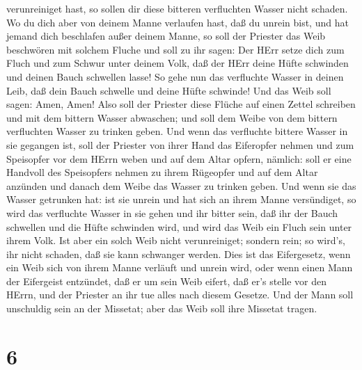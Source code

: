 verunreiniget hast, so sollen dir diese bitteren verfluchten Wasser
nicht schaden.  Wo du dich aber von deinem Manne verlaufen
hast, daß du unrein bist, und hat jemand dich beschlafen außer deinem
Manne,  so soll der Priester das Weib beschwören mit
solchem Fluche und soll zu ihr sagen: Der HErr setze dich zum Fluch und
zum Schwur unter deinem Volk, daß der HErr deine Hüfte schwinden und
deinen Bauch schwellen lasse!  So gehe nun das verfluchte
Wasser in deinen Leib, daß dein Bauch schwelle und deine Hüfte schwinde!
Und das Weib soll sagen: Amen, Amen!  Also soll der
Priester diese Flüche auf einen Zettel schreiben und mit dem bittern
Wasser abwaschen;  und soll dem Weibe von dem bittern
verfluchten Wasser zu trinken geben. Und wenn das verfluchte bittere
Wasser in sie gegangen ist,  soll der Priester von ihrer
Hand das Eiferopfer nehmen und zum Speisopfer vor dem HErrn weben und
auf dem Altar opfern, nämlich:  soll er eine Handvoll des
Speisopfers nehmen zu ihrem Rügeopfer und auf dem Altar anzünden und
danach dem Weibe das Wasser zu trinken geben.  Und wenn sie
das Wasser getrunken hat: ist sie unrein und hat sich an ihrem Manne
versündiget, so wird das verfluchte Wasser in sie gehen und ihr bitter
sein, daß ihr der Bauch schwellen und die Hüfte schwinden wird, und wird
das Weib ein Fluch sein unter ihrem Volk.  Ist aber ein
solch Weib nicht verunreiniget; sondern rein; so wird's, ihr nicht
schaden, daß sie kann schwanger werden.  Dies ist das
Eifergesetz, wenn ein Weib sich von ihrem Manne verläuft und unrein
wird,  oder wenn einen Mann der Eifergeist entzündet, daß
er um sein Weib eifert, daß er's stelle vor den HErrn, und der Priester
an ihr tue alles nach diesem Gesetze.  Und der Mann soll
unschuldig sein an der Missetat; aber das Weib soll ihre Missetat
tragen.

\hypertarget{section-5}{%
\section{6}\label{section-5}}

